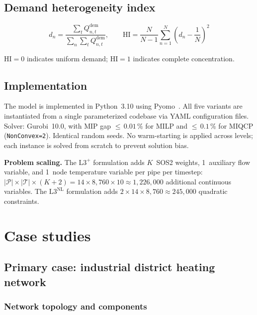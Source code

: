\documentclass[review,3p]{elsarticle}
\newcommand{\Lplus}{\mathrm{L3}^{+}}
\newcommand{\Lnl}{\mathrm{L3}^{\mathrm{NL}}}
\begin{document}
\subsection{Demand heterogeneity index}
\label{sec:model_hi}

\begin{equation}
  d_n = \frac{\sum_t Q_{n,t}^{\mathrm{dem}}}{\sum_n \sum_t
    Q_{n,t}^{\mathrm{dem}}},
  \qquad
  \mathrm{HI} = \frac{N}{N-1} \sum_{n=1}^{N}
    \left(d_n - \frac{1}{N}\right)^{\!2}
  \label{eq:hi}
\end{equation}

$\mathrm{HI} = 0$ indicates uniform demand;
$\mathrm{HI} = 1$ indicates complete concentration.

\subsection{Implementation}
\label{sec:model_impl}

The model is implemented in Python~3.10 using Pyomo~\cite{pyomo}.
All five variants are instantiated from a single parameterized
codebase via YAML configuration files. Solver: Gurobi~10.0, with MIP
gap ${\leq}\,0.01\,\%$ for MILP and ${\leq}\,0.1\,\%$ for MIQCP
(\texttt{NonConvex=2}). Identical random seeds. No warm-starting is
applied across levels; each instance is solved from scratch to prevent
solution bias.

\textbf{Problem scaling.} The $\Lplus$ formulation adds $K$~SOS2
weights, 1~auxiliary flow variable, and 1~node temperature variable
per pipe per timestep:
$|\mathcal{P}| \times |\mathcal{T}| \times (K+2)
= 14 \times 8{,}760 \times 10 \approx 1{,}226{,}000$
additional continuous variables. The $\Lnl$ formulation adds
$2 \times 14 \times 8{,}760 \approx 245{,}000$ quadratic constraints.

\section{Case studies}
\label{sec:case_studies}

\subsection{Primary case: industrial district heating network}
\label{sec:case_stadtbach}

\subsubsection{Network topology and components}
\end{document}
